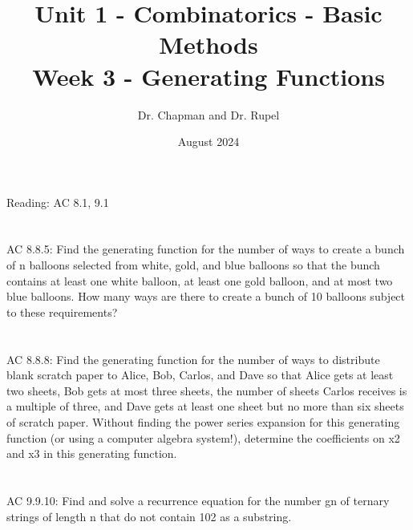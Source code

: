 \documentclass{article}
\title{Unit 1 - Combinatorics - Basic Methods\\ Week 3 - Generating Functions}
\author{Dr. Chapman and Dr. Rupel}
\date{August 2024}
\begin{document}
Reading: AC 8.1, 9.1
\section{}
AC 8.8.5:
Find the generating function for the number of ways to create a bunch of n balloons selected from white,
gold, and blue balloons so that the bunch contains at least one white balloon, at least one gold balloon,
and at most two blue balloons. How many ways are there to create a bunch of 10 balloons subject to these
requirements?
\section{}
AC 8.8.8:
Find the generating function for the number of ways to distribute blank scratch paper to Alice, Bob, Carlos,
and Dave so that Alice gets at least two sheets, Bob gets at most three sheets, the number of sheets Carlos
receives is a multiple of three, and Dave gets at least one sheet but no more than six sheets of scratch
paper. Without finding the power series expansion for this generating function (or using a computer algebra
system!), determine the coefficients on x2 and x3 in this generating function.
\section{}
AC 9.9.10:
Find and solve a recurrence equation for the number gn of ternary strings of length n that do not contain
102 as a substring.
\end{document}

